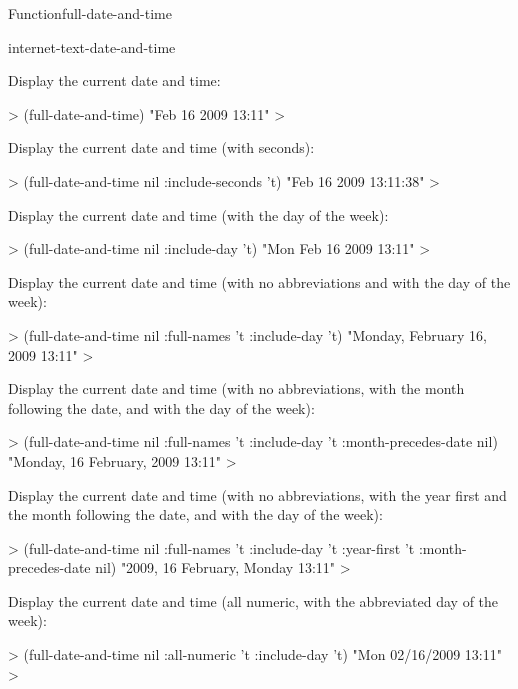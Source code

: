 \documentclass[10pt,twoside,english,pdftex]{article}
\begin{document}
\begin{functiondoc}{Function}{full-date-and-time}
\begin{alsos}{internet-text-date-and-time}
\end{alsos}

\fnexamples
Display the current date and time: 
%
\W\supp
\begin{example}
  > (full-date-and-time)
  "Feb 16 2009 13:11"
  >
\end{example}
%
Display the current date and time (with seconds):
%
\W\supp\notpretop
\begin{example}
  > (full-date-and-time nil :include-seconds 't)
  "Feb 16 2009 13:11:38"
  >
\end{example}
%
Display the current date and time (with the day of the week):
%
\W\supp\notpretop
\begin{example}
  > (full-date-and-time nil :include-day 't)
  "Mon Feb 16 2009 13:11"
  >
\end{example}
%
Display the current date and time (with no abbreviations and with the day of
the week):
%
\W\supp\notpretop
\begin{example}
  > (full-date-and-time nil :full-names 't :include-day 't)
  "Monday, February 16, 2009 13:11"
  >
\end{example}
%
Display the current date and time (with no abbreviations, with the month
following the date, and with the day of the week):
%
\W\supp\notpretop
\begin{example}
  > (full-date-and-time nil :full-names 't :include-day 't
                            :month-precedes-date nil)
  "Monday, 16 February, 2009 13:11"
  >
\end{example}
%
Display the current date and time (with no abbreviations, with the year first
and the month following the date, and with the day of the week):
%
\W\supp\notpretop
\begin{example}
  > (full-date-and-time nil :full-names 't :include-day 't
                            :year-first 't :month-precedes-date nil)
  "2009, 16 February, Monday 13:11"
  >
\end{example}
%
Display the current date and time (all numeric, with the abbreviated day of
the week):
%
\W\supp\notpretop
\begin{example}
  > (full-date-and-time nil :all-numeric 't :include-day 't)
  "Mon 02/16/2009 13:11"
  >
\end{example}

\end{functiondoc}
\end{document}
